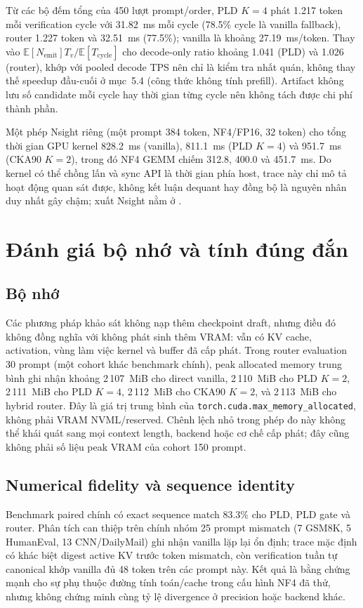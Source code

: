 Từ các bộ đếm tổng của 450 lượt prompt/order, PLD $K=4$ phát 1.217 token mỗi verification cycle với 31.82~ms mỗi cycle (78.5\% cycle là vanilla fallback), router 1.227 token và 32.51~ms (77.5\%); vanilla là khoảng 27.19~ms/token. Thay vào \(\mathbb{E}[N_{\mathrm{emit}}]T_v/\mathbb{E}[T_{\mathrm{cycle}}]\) cho decode-only ratio khoảng 1.041 (PLD) và 1.026 (router), khớp với pooled decode TPS nên chỉ là kiểm tra nhất quán, không thay thế speedup đầu-cuối ở mục~5.4 (công thức không tính prefill). Artifact không lưu số candidate mỗi cycle hay thời gian từng cycle nên không tách được chi phí thành phần.

Một phép Nsight riêng (một prompt 384 token, NF4/FP16, 32 token) cho tổng thời gian GPU kernel 828.2~ms (vanilla), 811.1~ms (PLD $K=4$) và 951.7~ms (CKA90 $K=2$), trong đó NF4 GEMM chiếm 312.8, 400.0 và 451.7~ms. Do kernel có thể chồng lấn và sync API là thời gian phía host, trace này chỉ mô tả hoạt động quan sát được, không kết luận dequant hay đồng bộ là nguyên nhân duy nhất gây chậm; xuất Nsight nằm ở .

\section{Đánh giá bộ nhớ và tính đúng đắn}

\subsection{Bộ nhớ}
Các phương pháp khảo sát không nạp thêm checkpoint draft, nhưng điều đó không đồng nghĩa với không phát sinh thêm VRAM: vẫn có KV cache, activation, vùng làm việc kernel và buffer đã cấp phát. Trong router evaluation 30 prompt (một cohort khác benchmark chính), peak allocated memory trung bình ghi nhận khoảng 2\,107~MiB cho direct vanilla, 2\,110~MiB cho PLD \(K=2\), 2\,111~MiB cho PLD \(K=4\), 2\,112~MiB cho CKA90 \(K=2\), và 2\,113~MiB cho hybrid router. Đây là giá trị trung bình của \texttt{torch.cuda.max\_memory\_allocated}, không phải VRAM NVML/reserved. Chênh lệch nhỏ trong phép đo này không thể khái quát sang mọi context length, backend hoặc cơ chế cấp phát; đây cũng không phải số liệu peak VRAM của cohort 150 prompt.

\subsection{Numerical fidelity và sequence identity}
Benchmark paired chính có exact sequence match 83.3\% cho PLD, PLD gate và router. Phân tích can thiệp trên chính nhóm 25 prompt mismatch (7 GSM8K, 5 HumanEval, 13 CNN/DailyMail) ghi nhận vanilla lặp lại ổn định; trace mặc định có khác biệt digest active KV trước token mismatch, còn verification tuần tự canonical khớp vanilla đủ 48 token trên các prompt này. Kết quả là bằng chứng mạnh cho sự phụ thuộc đường tính toán/cache trong cấu hình NF4 đã thử, nhưng không chứng minh cùng tỷ lệ divergence ở precision hoặc backend khác.

